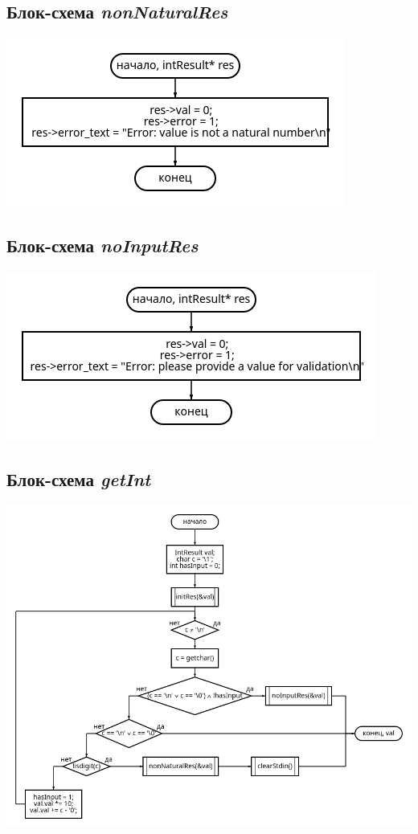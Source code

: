 \documentclass[a4paper, 12pt]{article}
\begin{document}
\subsection{Блок-схема \textit{nonNaturalRes}}
\includegraphics[width=\columnwidth]{nonNaturalRes.png}

\subsection{Блок-схема \textit{noInputRes}}
\includegraphics[width=\columnwidth]{noInputRes.png}

\subsection{Блок-схема \textit{getInt}}
\includegraphics[width=\columnwidth]{getInt.png}
\end{document}
